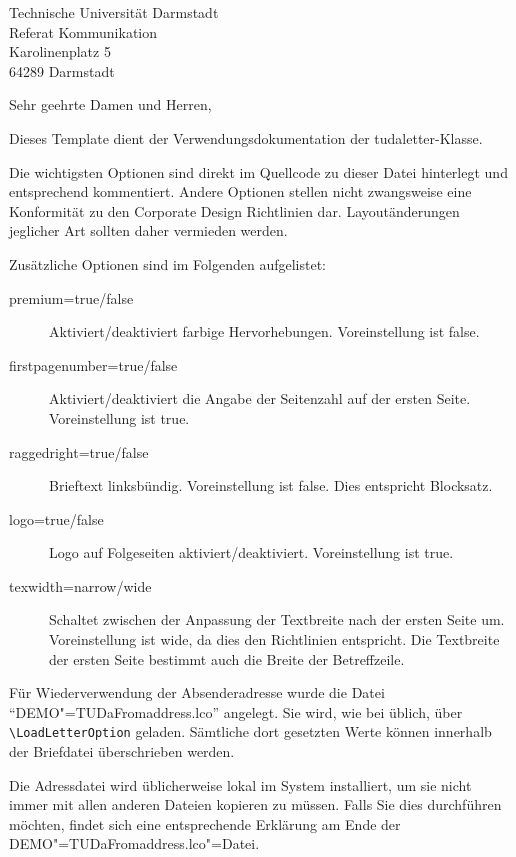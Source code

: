 \documentclass[
	german,
	accentcolor=9c,%
	premium=true,%
]{tudaletter}
\begin{document}
\begin{letter}{%
		Technische Universität Darmstadt\\%
		Referat Kommunikation\\%
		Karolinenplatz 5\\%
		64289 Darmstadt}


	\opening{Sehr geehrte Damen und Herren,}
	Dieses Template dient der Verwendungsdokumentation der tudaletter-Klasse.

	Die wichtigsten Optionen sind direkt im Quellcode zu dieser Datei hinterlegt und entsprechend kommentiert. Andere Optionen stellen nicht zwangsweise eine Konformität zu den Corporate Design Richtlinien dar. Layoutänderungen jeglicher Art sollten daher vermieden werden.

	Zusätzliche Optionen sind im Folgenden aufgelistet:\\
	\parbox{\linewidth}{
		\begin{description}
			\item[premium=true/false] Aktiviert/deaktiviert farbige Hervorhebungen. Voreinstellung ist false.
			\item[firstpagenumber=true/false] Aktiviert/deaktiviert die Angabe der Seitenzahl auf der ersten Seite. Voreinstellung ist true.
			\item[raggedright=true/false] Brieftext linksbündig. Voreinstellung ist false. Dies entspricht Blocksatz.
			\item[logo=true/false] Logo auf Folgeseiten aktiviert/deaktiviert. Voreinstellung ist true.
			\item[texwidth=narrow/wide] Schaltet zwischen der Anpassung der Textbreite nach der ersten Seite um. Voreinstellung ist wide, da dies den Richtlinien entspricht. Die Textbreite der ersten Seite bestimmt auch die Breite der Betreffzeile.
		\end{description}
	}

	Für Wiederverwendung der Absenderadresse wurde die Datei \enquote{DEMO"=TUDaFromaddress.lco} angelegt. Sie wird, wie bei \KOMAScript{} üblich, über
	\verb+\LoadLett+\verb+erOption+ geladen. Sämtliche dort gesetzten Werte können innerhalb der Briefdatei überschrieben werden.

	Die Adressdatei wird üblicherweise lokal im System installiert, um sie nicht immer mit allen anderen Dateien kopieren zu müssen. Falls Sie dies durchführen möchten, findet sich eine entsprechende Erklärung am Ende der DEMO"=TUDaFromaddress.lco"=Datei.


\end{letter}
\end{document}

